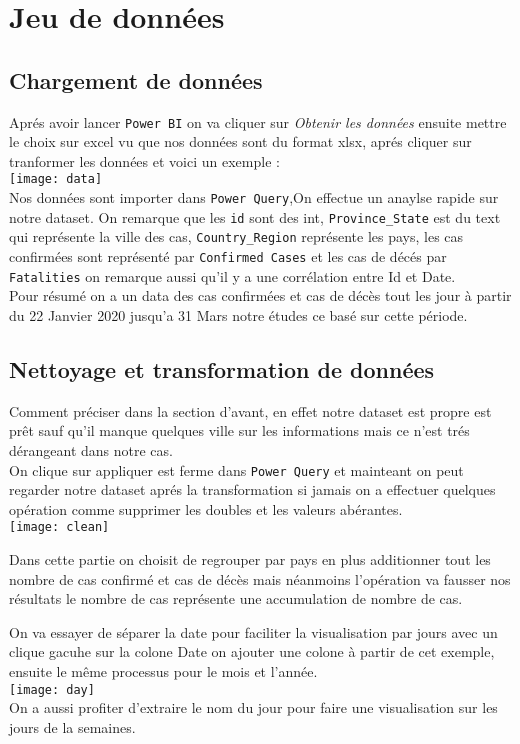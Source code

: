 \documentclass[french,a4paper,11pt,oneside]{book}
\begin{document}
	\section{Jeu de données}{
		
		\subsection{Chargement de données}{
			Aprés avoir lancer \texttt{Power BI} on va cliquer sur {\itshape Obtenir les données} ensuite mettre le choix sur excel vu que nos données sont du format xlsx, aprés cliquer sur tranformer les données et voici un exemple :\\
			\texttt{[image: data]}
			\\
			Nos données sont importer dans \texttt{Power Query},On effectue un anaylse rapide sur notre dataset.
			On remarque que les \texttt{id} sont des int, \texttt{Province\_State} est du text qui représente la ville des cas, \texttt{Country\_Region} représente les pays, les cas confirmées sont représenté par \texttt{Confirmed Cases} et les cas de décés par \texttt{Fatalities} on remarque aussi qu'il y a une corrélation entre Id et Date.\\
			Pour résumé on a un data des cas confirmées et cas de décès tout les jour à partir du 22 Janvier 2020 jusqu'a 31 Mars notre études ce basé sur cette période.\\
		}
		\subsection{Nettoyage et transformation de données}{
 			Comment préciser dans la section d'avant, en effet notre dataset est propre est prêt sauf qu'il manque quelques ville sur les informations mais ce n'est trés dérangeant dans notre cas.\\
 			On clique sur appliquer est ferme dans \texttt{Power Query} et mainteant on peut regarder notre dataset aprés la transformation si jamais on a effectuer quelques opération comme supprimer les doubles et les valeurs abérantes.\\
 			\texttt{[image: clean]}
 			
 		 	Dans cette partie on choisit de regrouper par pays en plus additionner tout les nombre de cas confirmé et cas de décès mais néanmoins l'opération va fausser nos résultats le nombre de cas représente une accumulation de nombre de cas.
 		 	
 		 	On va essayer de séparer la date pour faciliter la visualisation par jours avec un clique gacuhe sur la colone Date on ajouter une colone à partir de cet exemple, ensuite le même processus pour le mois et l'année.\\
 			\texttt{[image: day]}
 			\\
 			On a aussi profiter d'extraire le nom du jour pour faire une visualisation sur les jours de la semaines.
		}
}
\end{document}
